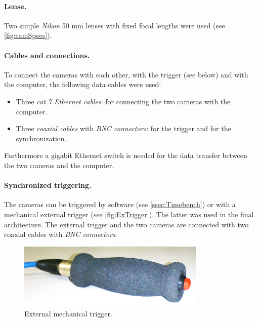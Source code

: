 \paragraph{Lense.}
Two simple \textit{Nikon} 50 mm lenses with fixed focal lengths were used (see \autoref{fig:camSpecs}).

\paragraph{Cables and connections.}
To connect the cameras with each other, with the trigger (see below) and with the computer, the following data cables were used:
\begin{itemize}
\item Three \textit{cat 7 Ethernet cables}: for connecting the two cameras with the computer.
\item Three \textit{coaxial cables} with \textit{BNC connectors}: for the trigger and for the synchronization.
\end{itemize}
Furthermore a gigabit Ethernet switch is needed for the data transfer between the two cameras and the computer.

\paragraph{Synchronized triggering.}
The cameras can be triggered by software (see \autoref{ssec:Timebench}) or with a mechanical external trigger (see \autoref{fig:ExTrigger}). The latter was used in the final architecture. The external trigger and the two cameras are connected with two coaxial cables with \textit{BNC connectors}.  

\begin{figure}[htbp]
		\centering
		\includegraphics[width=0.8\textwidth]{figures/Trigger}
		\caption[External mechanical trigger]{External mechanical trigger.}
		\label{fig:ExTrigger}
\end{figure}

